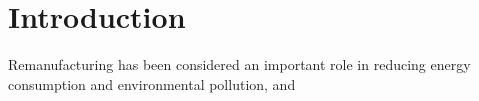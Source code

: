 \chapter{Introduction}
Remanufacturing has been considered an important role in reducing energy consumption and environmental pollution, and 